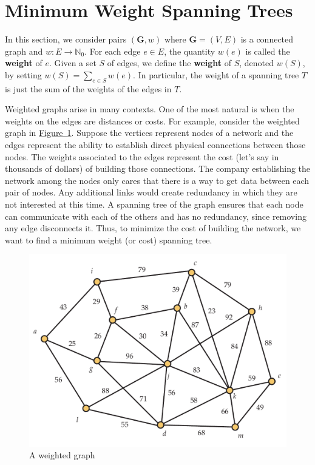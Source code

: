 \documentclass[10pt,]{book}
\newcommand{\terminology}[1]{\textbf{#1}}
\theoremstyle{plain}
\theoremstyle{definition}
\theoremstyle{definition}
\theoremstyle{definition}
\theoremstyle{definition}
\numberwithin{equation}{section}
\newcommand{\nonnegints}{\mathbb{N}_0}
\newcommand{\GVE}{\mathbf{G}=(V,E)}
\newcommand{\bfG}{\mathbf{G}}
\begin{document}
\section[{Minimum Weight Spanning Trees}]{Minimum Weight Spanning Trees}\label{s_graphalgorithms_min-wt-span}
\hypertarget{p-160}{}%
In this section, we consider pairs \((\bfG,w)\) where \(\GVE\) is a connected graph and \(w\colon E\rightarrow\nonnegints\). For each edge \(e\in E\), the quantity \(w(e)\) is called the \terminology{weight} of \(e\). Given a set \(S\) of edges, we define the \terminology{weight} of \(S\), denoted \(w(S)\), by setting \(w(S)=\sum_{e\in S} w(e)\). In particular, the weight of a spanning tree \(T\) is just the sum of the weights of the edges in \(T\).%
\par
\hypertarget{p-161}{}%
Weighted graphs arise in many contexts. One of the most natural is when the weights on the edges are distances or costs. For example, consider the weighted graph in \hyperref[fig_graphalgorithms_spantreegraph]{Figure~\ref{fig_graphalgorithms_spantreegraph}}. Suppose the vertices represent nodes of a network and the edges represent the ability to establish direct physical connections between those nodes. The weights associated to the edges represent the cost (let's say in thousands of dollars) of building those connections. The company establishing the network among the nodes only cares that there is a way to get data between each pair of nodes. Any additional links would create redundancy in which they are not interested at this time. A spanning tree of the graph ensures that each node can communicate with each of the others and has no redundancy, since removing any edge disconnects it. Thus, to minimize the cost of building the network, we want to find a minimum weight (or cost) spanning tree.%
\begin{figure}
\centering
\includegraphics[width=0.9\linewidth]{images/spantreegraph}
\caption{A weighted graph\label{fig_graphalgorithms_spantreegraph}}
\end{figure}
\end{document}
